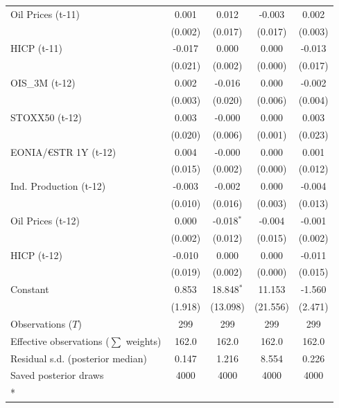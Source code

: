 \begin{longtable}[t]{lcccc}
Oil Prices (t-11) & 0.001 & 0.012 & -0.003 & 0.002\\
 & (0.002) & (0.017) & (0.017) & (0.003)\\
HICP (t-11) & -0.017 & 0.000 & 0.000 & -0.013\\
 & (0.021) & (0.002) & (0.000) & (0.017)\\
OIS\_3M (t-12) & 0.002 & -0.016 & 0.000 & -0.002\\
 & (0.003) & (0.020) & (0.006) & (0.004)\\
STOXX50 (t-12) & 0.003 & -0.000 & 0.000 & 0.003\\
 & (0.020) & (0.006) & (0.001) & (0.023)\\
EONIA/€STR 1Y (t-12) & 0.004 & -0.000 & 0.000 & 0.001\\
 & (0.015) & (0.002) & (0.000) & (0.012)\\
Ind. Production (t-12) & -0.003 & -0.002 & 0.000 & -0.004\\
 & (0.010) & (0.016) & (0.003) & (0.013)\\
Oil Prices (t-12) & 0.000 & -0.018$^{*}$ & -0.004 & -0.001\\
 & (0.002) & (0.012) & (0.015) & (0.002)\\
HICP (t-12) & -0.010 & 0.000 & 0.000 & -0.011\\
 & (0.019) & (0.002) & (0.000) & (0.015)\\
Constant & 0.853 & 18.848$^{*}$ & 11.153 & -1.560\\
 & (1.918) & (13.098) & (21.556) & (2.471)\\
\midrule
Observations ($T$) & 299 & 299 & 299 & 299\\
Effective observations ($\sum$ weights) & 162.0 & 162.0 & 162.0 & 162.0\\
Residual s.d. (posterior median) & 0.147 & 1.216 & 8.554 & 0.226\\
Saved posterior draws & 4000 & 4000 & 4000 & 4000\\*
\end{longtable}
\endgroup{}

